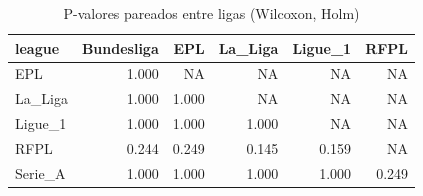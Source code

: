 \begin{table}

\caption{\label{tab:pareado_ligas_g20}P-valores pareados entre ligas (Wilcoxon, Holm)}
\centering
\begin{tabular}[t]{lrrrrr}
\toprule
league & Bundesliga & EPL & La\_Liga & Ligue\_1 & RFPL\\
\midrule
EPL & 1.000 & NA & NA & NA & NA\\
La\_Liga & 1.000 & 1.000 & NA & NA & NA\\
Ligue\_1 & 1.000 & 1.000 & 1.000 & NA & NA\\
RFPL & 0.244 & 0.249 & 0.145 & 0.159 & NA\\
Serie\_A & 1.000 & 1.000 & 1.000 & 1.000 & 0.249\\
\bottomrule
\end{tabular}
\end{table}
